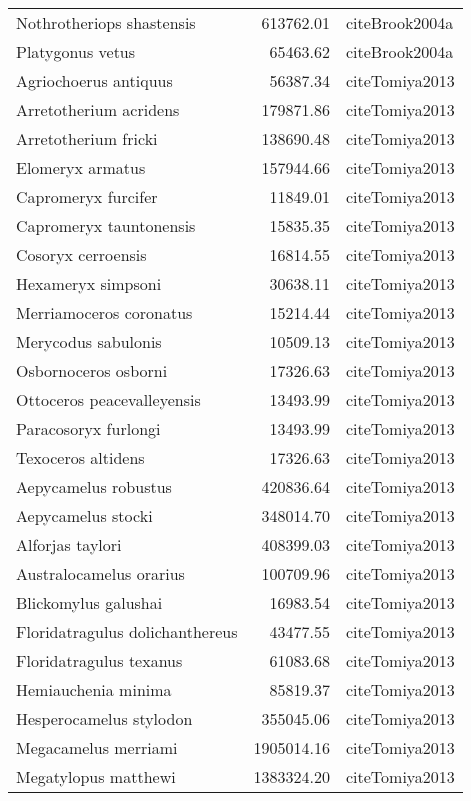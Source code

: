 \begin{table}[ht]
\begin{tabular}{lrl}
  Nothrotheriops shastensis & 613762.01 & cite{Brook2004a} \\ 
  Platygonus vetus & 65463.62 & cite{Brook2004a} \\ 
  Agriochoerus antiquus & 56387.34 & cite{Tomiya2013} \\ 
  Arretotherium acridens & 179871.86 & cite{Tomiya2013} \\ 
  Arretotherium fricki & 138690.48 & cite{Tomiya2013} \\ 
  Elomeryx armatus & 157944.66 & cite{Tomiya2013} \\ 
  Capromeryx furcifer & 11849.01 & cite{Tomiya2013} \\ 
  Capromeryx tauntonensis & 15835.35 & cite{Tomiya2013} \\ 
  Cosoryx cerroensis & 16814.55 & cite{Tomiya2013} \\ 
  Hexameryx simpsoni & 30638.11 & cite{Tomiya2013} \\ 
  Merriamoceros coronatus & 15214.44 & cite{Tomiya2013} \\ 
  Merycodus sabulonis & 10509.13 & cite{Tomiya2013} \\ 
  Osbornoceros osborni & 17326.63 & cite{Tomiya2013} \\ 
  Ottoceros peacevalleyensis & 13493.99 & cite{Tomiya2013} \\ 
  Paracosoryx furlongi & 13493.99 & cite{Tomiya2013} \\ 
  Texoceros altidens & 17326.63 & cite{Tomiya2013} \\ 
  Aepycamelus robustus & 420836.64 & cite{Tomiya2013} \\ 
  Aepycamelus stocki & 348014.70 & cite{Tomiya2013} \\ 
  Alforjas taylori & 408399.03 & cite{Tomiya2013} \\ 
  Australocamelus orarius & 100709.96 & cite{Tomiya2013} \\ 
  Blickomylus galushai & 16983.54 & cite{Tomiya2013} \\ 
  Floridatragulus dolichanthereus & 43477.55 & cite{Tomiya2013} \\ 
  Floridatragulus texanus & 61083.68 & cite{Tomiya2013} \\ 
  Hemiauchenia minima & 85819.37 & cite{Tomiya2013} \\ 
  Hesperocamelus stylodon & 355045.06 & cite{Tomiya2013} \\ 
  Megacamelus merriami & 1905014.16 & cite{Tomiya2013} \\ 
  Megatylopus matthewi & 1383324.20 & cite{Tomiya2013} \\ 

\end{tabular}
\end{table}
